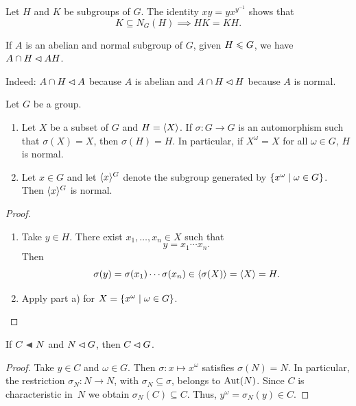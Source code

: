 \begin{rem}\label{product-is-subgroup-condition}
    Let\/ $H$ and $K$ be subgroups of\/ $G$. The identity $xy=yx^{y^{-1}}$ shows that
    $$
        K\subseteq N_G(H)\implies HK=KH.
    $$
\end{rem}

\begin{rem}\label{abelian-normal}
    If\/ $A$ is an abelian and normal subgroup of\/ $G$, given\/ $H\leqslant G$, we have\/ $A\cap H\lhd AH$.

    \textrm{\upshape Indeed: $A\cap H\lhd A$ because $A$ is abelian and $A\cap H\lhd H$ because $A$ is normal.}
\end{rem}

\begin{prop}\label{normal-closure} Let $G$ be a group.
    \begin{enumerate}[\upshape a)]
        \item Let $X$ be a subset of\/ $G$ and\/ $H=\langle X\rangle$. If $\sigma\colon G\to G$ is an automorphism such that $\sigma(X)=X$, then $\sigma(H)=H$. In particular, if\/ $X^\omega=X$ for all $\omega\in G$, $H$ is normal.

        \item Let $x\in G$ and let $\langle x\rangle^G$ denote the subgroup generated by $\{x^\omega\mid\omega\in G\}$. Then $\langle x\rangle^G$ is normal.
    \end{enumerate}
\end{prop}

\begin{proof}${}$
\begin{enumerate}[\upshape a)]
    \item Take $y\in H$. There exist $x_1,\dots,x_n\in X$ such that
    $$
        y=x_1\cdots x_n.
    $$
    Then
    $$
        \sigma(y) = \sigma(x_1)\cdots\sigma(x_n)\in\langle\sigma(X)\rangle=\langle X\rangle=H.
    $$

    \item Apply part a) for $X=\{x^\omega\mid\omega\in G\}$. \qedhere
\end{enumerate}
\end{proof}

\begin{lem}\label{normal-transitivity}
    If $C\ch N$ and $N\lhd G$, then $C\lhd G$.
\end{lem}

\begin{proof} Take $y\in C$ and $\omega\in G$. Then $\sigma\colon x\mapsto x^\omega$ satisfies $\sigma(N)=N$. In particular, the restriction $\sigma_N\colon N\to N$, with $\sigma_N\subseteq\sigma$, belongs to ${\rm Aut}(N)$. Since $C$ is characteristic in~$N$ we obtain $\sigma_N(C)\subseteq C$. Thus, $y^\omega=\sigma_N(y)\in C$.  \end{proof}

